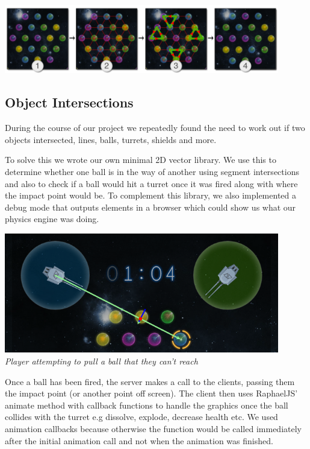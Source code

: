 \documentclass[a4wide, 11pt]{article}
\begin{document}
\begin{center}

    \includegraphics[width=0.9\textwidth]{images/triangles.png} \\
\end{center}

\subsection{Object Intersections}
During the course of our project we repeatedly found the need to work out if two objects intersected, lines, balls, turrets, shields and more.

To solve this we wrote our own minimal 2D vector library. We use this to determine whether one ball is in the way of another using segment intersections and also to check if a ball would hit a turret once it was fired along with where the impact point would be. To complement this library, we also implemented a debug mode that outputs elements in a browser which could show us what our physics engine was doing.

\begin{center}

    \includegraphics[width=0.9\textwidth]{images/shoot_block.png} \\
    \emph{Player attempting to pull a ball that they can't reach}
\end{center}

Once a ball has been fired, the server makes a call to the clients, passing them the impact point (or another point off screen). The client then uses RaphaelJS' animate method with callback functions to handle the graphics once the ball collides with the turret e.g dissolve, explode, decrease health etc. We used animation callbacks because otherwise the function would be called immediately after the initial animation call and not when the animation was finished.
\end{document}
